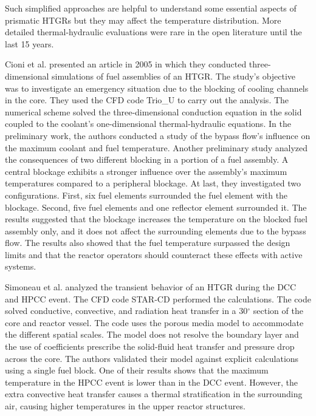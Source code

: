 Such simplified approaches are helpful to understand some essential aspects of prismatic \glspl{HTGR} but they may affect the temperature distribution.
More detailed thermal-hydraulic evaluations were rare in the open literature until the last 15 years.

Cioni et al. \cite{cioni_3d_2005} presented an article in 2005 in which they conducted three-dimensional simulations of fuel assemblies of an \gls{HTGR}.
The study's objective was to investigate an emergency situation due to the blocking of cooling channels in the core.
They used the \gls{CFD} code Trio\_U \cite{bieder_priceles_2000} to carry out the analysis.
The numerical scheme solved the three-dimensional conduction equation in the solid coupled to the coolant's one-dimensional thermal-hydraulic equations.
In the preliminary work, the authors conducted a study of the bypass flow's influence on the maximum coolant and fuel temperature.
Another preliminary study analyzed the consequences of two different blocking in a portion of a fuel assembly.
A central blockage exhibits a stronger influence over the assembly's maximum temperatures compared to a peripheral blockage.
At last, they investigated two configurations.
First, six fuel elements surrounded the fuel element with the blockage.
Second, five fuel elements and one reflector element surrounded it.
The results suggested that the blockage increases the temperature on the blocked fuel assembly only, and it does not affect the surrounding elements due to the bypass flow.
The results also showed that the fuel temperature surpassed the design limits and that the reactor operators should counteract these effects with active systems.

Simoneau et al. \cite{simoneau_three-dimensional_2007} analyzed the transient behavior of an \gls{HTGR} during the \gls{DCC} and \gls{HPCC} event.
The CFD code STAR-CD \cite{computational_dynamics_limited_star-cd_2004} performed the calculations.
The code solved conductive, convective, and radiation heat transfer in a 30$^{\circ}$ section of the core and reactor vessel.
The code uses the porous media model to accommodate the different spatial scales.
The model does not resolve the boundary layer and the use of coefficients prescribe the solid-fluid heat transfer and pressure drop across the core.
The authors validated their model against explicit calculations using a single fuel block.
One of their results shows that the maximum temperature in the \gls{HPCC} event is lower than in the \gls{DCC} event.
However, the extra convective heat transfer causes a thermal stratification in the surrounding air, causing higher temperatures in the upper reactor structures.

